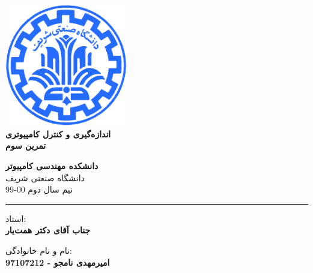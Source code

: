 \documentclass[12pt]{article}
\begin{document}
\begin{titlepage}
\begin{center}
        
\vspace*{0.7cm}

\includegraphics[width=0.4\textwidth]{sharif1.png}\\
\vspace{0.5cm}
\textbf{ \Huge{\emph ‌اندازه‌گیری و کنترل کامپیوتری} }\\
\vspace{0.5cm}
\textbf{ \Large{ تمرین سوم} }
\vspace{0.2cm}
       
 
      \large \textbf{دانشکده مهندسی کامپیوتر}\\\vspace{0.2cm}
    \large   دانشگاه صنعتی شریف\\\vspace{0.2cm}
       \large   ﻧﯿﻢ سال دوم 00-99 \\\vspace{0.2cm}
      \noindent\rule[1ex]{\linewidth}{1pt}
استاد:\\
    \textbf{{جناب آقای دکتر همت‌یار}}


    \vspace{0.15cm}
نام و نام خانوادگی:\\

       
    \textbf{{امیرمهدی نامجو - 97107212}}
\end{center}
\end{titlepage}


\newpage
\pagestyle{fancy}
\fancyhf{}
\fancyfoot{}
\cfoot{\thepage}
\end{document}
